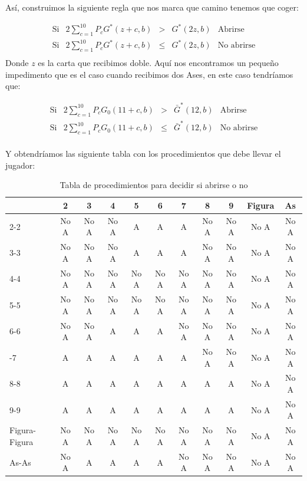 \documentclass[12pt,a4paper,]{book}
\numberwithin{dummy}{section}
\theoremstyle{ocrenumbox}
\theoremstyle{blacknumex}
\theoremstyle{blacknumbox}
\theoremstyle{ocrenum}
\theoremstyle{ocrenum}
\begin{document}
Así, construimos la siguiente regla que nos marca que camino tenemos que
coger:

\[
\begin{array}{cllll}
\text{Si} & 2 \sum_{c=1}^{10}P_cG^*(z+c,b) & > & G^*(2z,b) & \text{Abrirse} \\
\text{Si} & 2 \sum_{c=1}^{10}P_cG^*(z+c,b) & \leq & G^*(2z,b) & \text{No abrirse}\\
\end{array}
\] Donde \(z\) es la carta que recibimos doble. Aquí nos encontramos un
pequeño impedimento que es el caso cuando recibimos dos Ases, en este
caso tendríamos que:

\[
\begin{array}{cllll}
\text{Si} & 2 \sum_{c=1}^{10}P_cG_0(11+c,b) & > & \bar G^*(12,b) & \text{Abrirse} \\
\text{Si} & 2 \sum_{c=1}^{10}P_cG_0(11+c,b) & \leq & \bar G^*(12,b)& \text{No abrirse}\\
\end{array}
\]

Y obtendríamos las siguiente tabla con los procedimientos que debe
llevar el jugador:

\begingroup\fontsize{12}{14}\selectfont

\begin{longtable}[t]{lcccccccccc}
\caption{\label{tab:unnamed-chunk-44}Tabla de procedimientos para decidir si abrirse o no}\\
\toprule
 & 2 & 3 & 4 & 5 & 6 & 7 & 8 & 9 & Figura & As\\
\midrule
2-2 & No A & No A & No A & A & A & A & No A & No A & No A & No A\\
3-3 & No A & No A & No A & A & A & A & No A & No A & No A & No A\\
4-4 & No A & No A & No A & No A & No A & No A & No A & No A & No A & No A\\
5-5 & No A & No A & No A & No A & No A & No A & No A & No A & No A & No A\\
6-6 & No A & No A & A & A & A & No A & No A & No A & No A & No A\\
\addlinespace
7-7 & A & A & A & A & A & A & No A & No A & No A & No A\\
8-8 & A & A & A & A & A & A & A & A & No A & No A\\
9-9 & A & A & A & A & A & A & A & A & No A & No A\\
Figura-Figura & No A & No A & No A & No A & No A & No A & No A & No A & No A & No A\\
As-As & No A & A & A & A & A & No A & No A & No A & No A & No A\\
\bottomrule
\end{longtable}
\endgroup{}
\end{document}
